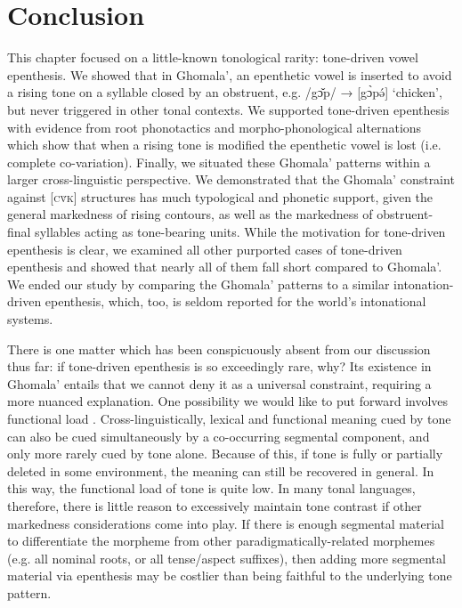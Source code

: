 \documentclass[output=paper,colorlinks,citecolor=brown,draft,draftmode]{langscibook}
\begin{document}
\section{Conclusion}\label{sec:conclusion}
This chapter focused on a little-known tonological rarity: tone-driven vowel epenthesis. 
We showed that in Ghomala', an epenthetic vowel is inserted to avoid a rising tone on a syllable closed by an obstruent, e.g. /g\v{ɔ}p/ → [g\`ɔp\'ə] `chicken', but never triggered in other tonal contexts.
We supported tone\hyp driven epenthesis with evidence from root phonotactics and morpho-phonological alternations which show that when a rising tone is modified the epenthetic vowel is lost (i.e. complete co-variation).
Finally, we situated these Ghomala' patterns within a larger cross-linguistic perspective. 
We demonstrated that the Ghomala' constraint against [\textsc{c\v{v}k}] structures has much typological and phonetic support, given the general markedness of rising contours, as well as the markedness of obstruent\hyp final syllables acting as tone-bearing units.
While the motivation for tone\hyp driven epenthesis is clear, we examined  all other purported cases of tone\hyp driven epenthesis and showed that nearly all of them fall short compared to Ghomala'.
We ended our study by comparing the Ghomala' patterns to a similar intonation-driven epenthesis, which, too, is  seldom reported for the world's intonational systems. 

There is one matter which has been conspicuously absent from our discussion thus far: if tone-driven epenthesis is so exceedingly rare, why?
Its existence in Ghomala' entails that we cannot deny it as a universal constraint, requiring a more nuanced explanation.
One possibility we would like to put forward involves functional load \citep{hockett1955manual,hockett1966quantification,wedel2013high,hall2019phonological}.
Cross-linguistically, lexical and functional meaning cued by tone can also be cued simultaneously by a co-occurring segmental component, and only more rarely cued by tone alone. 
Because of this, if tone is fully or partially deleted in some environment, the meaning can still be recovered in general.
In this way, the functional load of tone is quite low.
In many tonal languages, therefore, there is little reason to excessively maintain tone contrast if other markedness considerations come into play.
If there is enough segmental material to differentiate the morpheme from other paradigmatically-related morphemes (e.g. all nominal roots, or all tense/aspect suffixes), then adding more segmental material via epenthesis may be costlier than being faithful to the underlying tone pattern.
\end{document}
